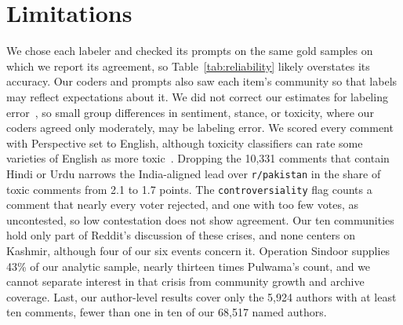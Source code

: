 \section{Limitations}

We chose each labeler and checked its prompts on the same gold samples on which we report its agreement, so Table~\ref{tab:reliability} likely overstates its accuracy. Our coders and prompts also saw each item's community so that labels may reflect expectations about it. We did not correct our estimates for labeling error~\cite{angelopoulos2023ppi,egami2023surrogates}, so small group differences in sentiment, stance, or toxicity, where our coders agreed only moderately, may be labeling error. We scored every comment with Perspective set to English, although toxicity classifiers can rate some varieties of English as more toxic~\cite{sap2019racialbias}. Dropping the 10,331 comments that contain Hindi or Urdu narrows the India-aligned lead over \texttt{r/pakistan} in the share of toxic comments from 2.1 to 1.7 points. The \texttt{controversiality} flag counts a comment that nearly every voter rejected, and one with too few votes, as uncontested, so low contestation does not show agreement. Our ten communities hold only part of Reddit's discussion of these crises, and none centers on Kashmir, although four of our six events concern it. Operation Sindoor supplies 43\% of our analytic sample, nearly thirteen times Pulwama's count, and we cannot separate interest in that crisis from community growth and archive coverage. Last, our author-level results cover only the 5,924 authors with at least ten comments, fewer than one in ten of our 68,517 named authors.
